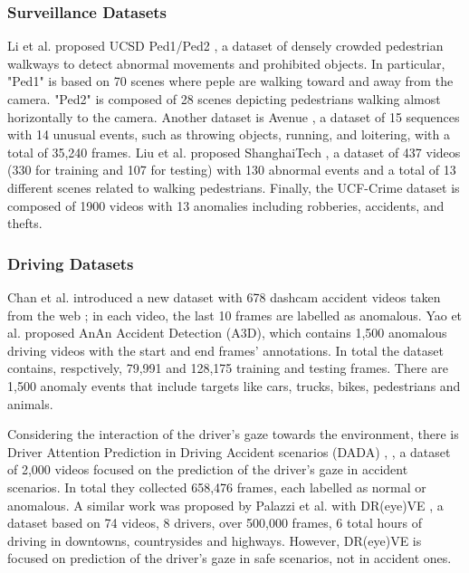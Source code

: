 \subsubsection*{Surveillance Datasets}
Li et al. proposed UCSD Ped1/Ped2 \cite{ucsd}, 
a dataset of densely 
crowded pedestrian walkways to detect abnormal movements and prohibited objects.
In particular, "Ped1" is based on 70 scenes where peple are walking toward and 
away from the camera.
"Ped2" is composed of 28 scenes depicting pedestrians walking almost 
horizontally to the camera.
Another dataset is Avenue \cite{avenue}, a dataset of 15 sequences with 14 
unusual events, such as throwing objects, running, and loitering, with a total 
of 35,240 frames.
Liu et al. proposed ShanghaiTech \cite{shanghaitech_dataset}, a dataset of 437 
videos (330 
for training and 107 for testing) with 130 abnormal events and a total of 
13 different scenes related to walking pedestrians.
Finally, the UCF-Crime dataset \cite{ucf_crime} is composed of 1900 videos 
with 13 anomalies including robberies, accidents, and thefts.

\subsubsection*{Driving Datasets}
Chan et al. introduced a new dataset with 678 dashcam accident videos taken from 
the web \cite{anticip_accident_dashcam}; in each video, the last 10 frames are 
labelled as anomalous.
Yao et al. proposed AnAn Accident Detection (A3D)\cite{a3d}, which contains 1,500
anomalous driving videos with the start and end frames' annotations. In total 
the dataset contains, respctively, 79,991 and 128,175 training and testing frames.
There are 1,500 anomaly events that include targets like cars, trucks, bikes, 
pedestrians and animals.

Considering the interaction of the driver's gaze towards the environment,
there is Driver Attention Prediction in Driving Accident scenarios (DADA) 
\cite{dada1}, \cite{dada2}, a dataset of 2,000 videos focused on the prediction 
of the driver's gaze in accident scenarios. In total they collected 658,476 
frames, each labelled as normal or anomalous. A similar work was proposed 
by Palazzi et al. with DR(eye)VE \cite{dreyeve}, a dataset based on 74 
videos, 8 drivers, over 500,000 frames, 6 total hours of driving in 
downtowns, countrysides and highways. 
However, DR(eye)VE is focused on prediction of the driver's gaze in 
safe scenarios, not in accident ones.

